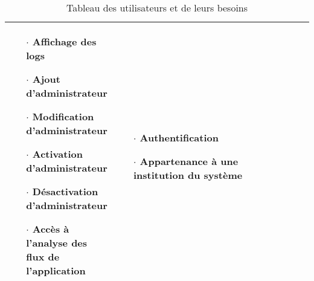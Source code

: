 \begin{table}
\begin{tabular}{|p{0.21\linewidth}|p{0.54\linewidth}|p{0.33\linewidth}|}
\begin{itemize}
                                \item[$\cdot$]  Affichage des logs
                                \item[$\cdot$]  Ajout d'administrateur
                                \item[$\cdot$]  Modification d'administrateur
                                \item[$\cdot$]  Activation d'administrateur
                                \item[$\cdot$]  Désactivation d'administrateur
                                \item[$\cdot$]  Accès à l'analyse des flux de l'application 
                        \end{itemize} & 
                        \begin{itemize}
                                \item[$\cdot$] Authentification 
                                \item[$\cdot$] Appartenance à une institution du système 
                        \end{itemize}
                         \\
                \hline  
        \end{tabular}
        \caption{Tableau des utilisateurs et de leurs besoins} \label{tab:sometab}
\end{table}
\par